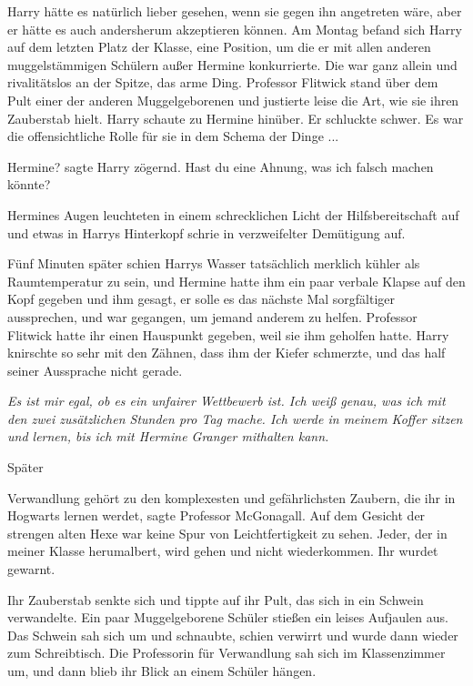 Harry hätte es natürlich lieber gesehen, wenn sie gegen ihn angetreten wäre,
aber er hätte es auch andersherum akzeptieren können. Am Montag befand sich
Harry auf dem letzten Platz der Klasse, eine Position, um die er mit allen
anderen muggelstämmigen Schülern außer Hermine konkurrierte. Die war ganz allein
und rivalitätslos an der Spitze, das arme Ding. Professor Flitwick stand über
dem Pult einer der anderen Muggelgeborenen und justierte leise die Art, wie sie
ihren Zauberstab hielt. Harry schaute zu Hermine hinüber. Er schluckte schwer.
Es war die offensichtliche Rolle für sie in dem Schema der Dinge ...

\glqq{}Hermine?\grqq{} sagte Harry zögernd. \glqq{}Hast du eine Ahnung, was ich
falsch machen könnte?\grqq{}

Hermines Augen leuchteten in einem schrecklichen Licht der Hilfsbereitschaft auf
und etwas in Harrys Hinterkopf schrie in verzweifelter Demütigung auf.

Fünf Minuten später schien Harrys Wasser tatsächlich merklich kühler als
Raumtemperatur zu sein, und Hermine hatte ihm ein paar verbale Klapse auf den
Kopf gegeben und ihm gesagt, er solle es das nächste Mal sorgfältiger
aussprechen, und war gegangen, um jemand anderem zu helfen. Professor Flitwick
hatte ihr einen Hauspunkt gegeben, weil sie ihm geholfen hatte. Harry knirschte
so sehr mit den Zähnen, dass ihm der Kiefer schmerzte, und das half seiner
Aussprache nicht gerade.

\emph{Es ist mir egal, ob es ein unfairer Wettbewerb ist. Ich weiß genau, was
ich mit den zwei zusätzlichen Stunden pro Tag mache. Ich werde in meinem Koffer
sitzen und lernen, bis ich mit Hermine Granger mithalten kann.}

Später

\glqq{}Verwandlung gehört zu den komplexesten und gefährlichsten Zaubern, die ihr
in Hogwarts lernen werdet\grqq{}, sagte Professor McGonagall. Auf dem Gesicht
der strengen alten Hexe war keine Spur von Leichtfertigkeit zu sehen. \glqq{}
Jeder, der in meiner Klasse herumalbert, wird gehen und nicht wiederkommen. Ihr
wurdet gewarnt.\grqq{}

Ihr Zauberstab senkte sich und tippte auf ihr Pult, das sich in ein Schwein
verwandelte. Ein paar Muggelgeborene Schüler stießen ein leises Aufjaulen aus.
Das Schwein sah sich um und schnaubte, schien verwirrt und wurde dann wieder zum
Schreibtisch. Die Professorin für Verwandlung sah sich im Klassenzimmer um, und
dann blieb ihr Blick an einem Schüler hängen.

